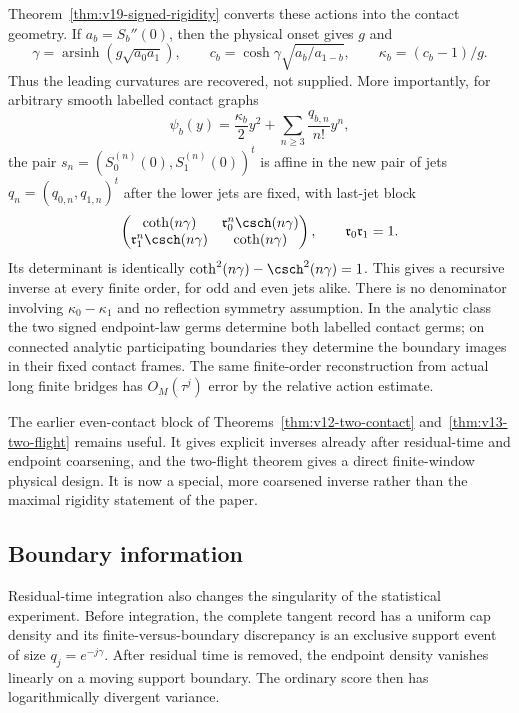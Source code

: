 Theorem~\ref{thm:v19-signed-rigidity} converts these actions into the
contact geometry.  If $a_b=S_b''(0)$, then the physical onset gives $g$ and
\begin{equation}\label{eq:v19-intro-leading-geometry}
 \gamma=\operatorname{arsinh}(g\sqrt{a_0a_1}),\qquad
 c_b=\cosh\gamma\sqrt{a_b/a_{1-b}},\qquad
 \kappa_b=(c_b-1)/g.
\end{equation}
Thus the leading curvatures are recovered, not supplied.  More importantly,
for arbitrary smooth labelled contact graphs
\[
 \psi_b(y)=\frac{\kappa_b}{2}y^2+
            \sum_{n\ge3}\frac{q_{b,n}}{n!}y^n,
\]
the pair $s_n=(S_0^{(n)}(0),S_1^{(n)}(0))^t$ is affine in the new pair of
jets $q_n=(q_{0,n},q_{1,n})^t$ after the lower jets are fixed, with last-jet
block
\begin{equation}\label{eq:v19-intro-jet-block}
 \begin{pmatrix}
 \coth(n\gamma)&\mathfrak r_0^n\csch(n\gamma)\\
 \mathfrak r_1^n\csch(n\gamma)&\coth(n\gamma)
 \end{pmatrix},
 \qquad \mathfrak r_0\mathfrak r_1=1.
\end{equation}
Its determinant is identically
$\coth^2(n\gamma)-\csch^2(n\gamma)=1$.  This gives a recursive inverse at
every finite order, for odd and even jets alike.  There is no denominator
involving $\kappa_0-\kappa_1$ and no reflection symmetry assumption.  In
the analytic class the two signed endpoint-law germs determine both labelled
contact germs; on connected analytic participating boundaries they determine
the boundary images in their fixed contact frames.  The same finite-order
reconstruction from actual long finite bridges has $O_M(\tau^j)$ error by
the relative action estimate.

The earlier even-contact block of
Theorems~\ref{thm:v12-two-contact} and~\ref{thm:v13-two-flight} remains
useful.  It gives explicit inverses already after residual-time and endpoint
coarsening, and the two-flight theorem gives a direct finite-window physical
design.  It is now a special, more coarsened inverse rather than the maximal
rigidity statement of the paper.

\subsection{Boundary information}
Residual-time integration also changes the singularity of the statistical
experiment.  Before integration, the complete tangent record has a uniform
cap density and its finite-versus-boundary discrepancy is an exclusive
support event of size
$q_j=e^{-j\gamma}$.  After residual time is removed, the endpoint density
vanishes linearly on a moving support boundary.  The ordinary score then has
logarithmically divergent variance.

